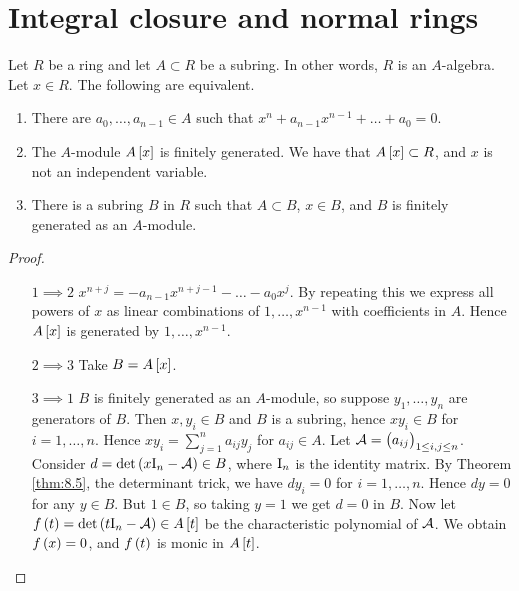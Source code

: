 \section{Integral closure and normal rings}

\begin{theorem}
Let $ R $ be a ring and let $ A \subset R $ be a subring. In other words, $ R $ is an $ A $-algebra. Let $ x \in R $. The following are equivalent.
\begin{enumerate}
\item There are $ a_0, \dots, a_{n - 1} \in A $ such that $ x^n + a_{n - 1}x^{n - 1} + \dots + a_0 = 0 $.
\item The $ A $-module $ A\sbr{x} $ is finitely generated. We have that $ A\sbr{x} \subset R $, and $ x $ is not an independent variable.
\item There is a subring $ B $ in $ R $ such that $ A \subset B $, $ x \in B $, and $ B $ is finitely generated as an $ A $-module.
\end{enumerate}
\end{theorem}

\begin{proof}
\hfill
\begin{itemize}[leftmargin=0.5in]
\item[$ 1 \implies 2 $] $ x^{n + j} = -a_{n - 1}x^{n + j - 1} - \dots - a_0x^j $. By repeating this we express all powers of $ x $ as linear combinations of $ 1, \dots, x^{n - 1} $ with coefficients in $ A $. Hence $ A\sbr{x} $ is generated by $ 1, \dots, x^{n - 1} $.
\item[$ 2 \implies 3 $] Take $ B = A\sbr{x} $.
\item[$ 3 \implies 1 $] $ B $ is finitely generated as an $ A $-module, so suppose $ y_1, \dots, y_n $ are generators of $ B $. Then $ x, y_i \in B $ and $ B $ is a subring, hence $ xy_i \in B $ for $ i = 1, \dots, n $. Hence $ xy_i = \sum_{j = 1}^n a_{ij}y_j $ for $ a_{ij} \in A $. Let $ \AAA = \br{a_{ij}}_{1 \le i, j \le n} $. Consider $ d = \det \br{x\I_n - \AAA} \in B $, where $ \mathrm{I}_n $ is the identity matrix. By Theorem \ref{thm:8.5}, the determinant trick, we have $ dy_i = 0 $ for $ i = 1, \dots, n $. Hence $ dy = 0 $ for any $ y \in B $. But $ 1 \in B $, so taking $ y = 1 $ we get $ d = 0 $ in $ B $. Now let $ f\br{t} = \det \br{t\I_n - \AAA} \in A\sbr{t} $ be the characteristic polynomial of $ \mathcal{A} $. We obtain $ f\br{x} = 0 $, and $ f\br{t} $ is monic in $ A\sbr{t} $.
\end{itemize}
\end{proof}

